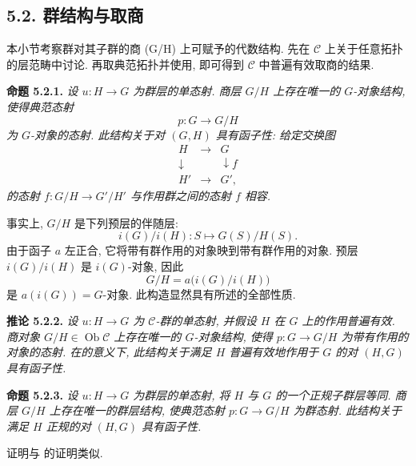 \subsection*{5.2. 群结构与取商}

本小节考察群对其子群的商 (G/H) 上可赋予的代数结构.
先在 \(\mathscr C\) 上关于任意拓扑的层范畴中讨论.
再取典范拓扑并使用,
即可得到 \(\mathscr C\) 中普遍有效取商的结果.

\medskip
\noindent{}\textbf{命题 5.2.1.}
\textit{设 \(u:H\to G\) 为群层的单态射.
商层 \(G/H\) 上存在唯一的 \(G\)-对象结构, 使得典范态射
\[
  p:G\longrightarrow G/H
\]
为 \(G\)-对象的态射. 此结构关于对 \((G,H)\) 具有函子性:
给定交换图
\[
  \begin{array}{ccc}
    H & \longrightarrow & G \\
    \downarrow && \downarrow\scriptstyle f \\
    H' & \longrightarrow & G',
  \end{array}
\]
 的态射 \(f:G/H\to G'/H'\)
与作用群之间的态射 \(f\) 相容.}

事实上, \(G/H\) 是下列预层的伴随层:
\[
  i(G)/i(H):S\longmapsto G(S)/H(S).
\]
由于函子 \(a\) 左正合, 它将带有群作用的对象映到带有群作用的对象.
预层 \(i(G)/i(H)\) 是 \(i(G)\)-对象, 因此
\[
  G/H=a\bigl(i(G)/i(H)\bigr)
\]
是 \(a(i(G))=G\)-对象. 此构造显然具有所述的全部性质.

\medskip
\noindent{}\textbf{推论 5.2.2.}
\textit{设 \(u:H\to G\) 为 \(\mathscr C\)-群的单态射,
并假设 \(H\) 在 \(G\) 上的作用普遍有效.
商对象 \(G/H\in\operatorname{Ob}\mathscr C\) 上存在唯一的 \(G\)-对象结构,
使得 \(p:G\to G/H\) 为带有作用的对象的态射.
在的意义下,
此结构关于满足 \(H\) 普遍有效地作用于 \(G\) 的对 \((H,G)\) 具有函子性.}

\medskip
\noindent{}\textbf{命题 5.2.3.}
\textit{设 \(u:H\to G\) 为群层的单态射, 将 \(H\) 与 \(G\) 的一个正规子群层等同.
商层 \(G/H\) 上存在唯一的群层结构, 使典范态射 \(p:G\to G/H\) 为群态射.
此结构关于满足 \(H\) 正规的对 \((H,G)\) 具有函子性.}

证明与 的证明类似.

